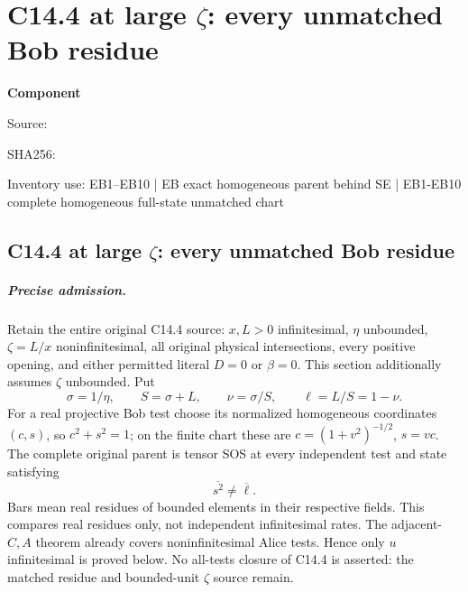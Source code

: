 \chapter{C14.4 at large $\zeta$: every unmatched Bob residue}
\label{component:p1a6cc124f5db}
\noindent\textbf{Component }\par
{\small\noindent Source: \par}
{\small\noindent SHA256: \par}
{\small\noindent Inventory use: EB1--EB10 | EB exact homogeneous parent behind SE | EB1-EB10 complete homogeneous full-state unmatched chart\par}
\medskip
\section{C14.4 at large $\zeta$: every unmatched Bob residue}
\label{p1a6cc124f5db:sec:r18-c144-bob-residue}

\paragraph{Precise admission.}
Retain the entire original C14.4 source: $x,L>0$ infinitesimal,
$\eta$ unbounded, $\zeta=L/x$ noninfinitesimal, all original physical
intersections, every positive opening, and either permitted literal
$D=0$ or $\beta=0$. This section additionally assumes $\zeta$
unbounded. Put
\[
 \sigma=1/\eta,\qquad S=\sigma+L,\qquad
 \nu=\sigma/S,\qquad \ell=L/S=1-\nu.
\]
For a real projective Bob test choose its normalized homogeneous
coordinates $(c,s)$, so $c^2+s^2=1$; on the finite chart these are
$c=(1+v^2)^{-1/2}$, $s=vc$. The complete original parent is tensor SOS
at every independent test and state satisfying
\[
                         \overline{s^2}\ne\overline\ell.       \tag{EB1}
\]
Bars mean real residues of bounded elements in their respective fields.
This compares real residues only, not independent infinitesimal rates.
The adjacent-$C,A$ theorem already covers noninfinitesimal Alice
tests. Hence only $u$ infinitesimal is proved below. No all-tests
closure of C14.4 is asserted: the matched residue and bounded-unit
$\zeta$ source remain.

